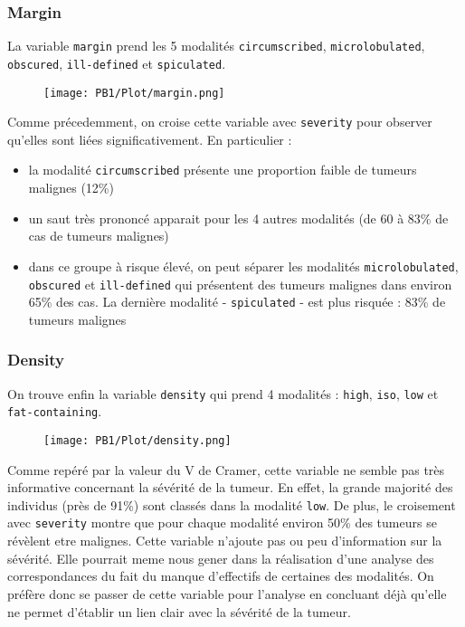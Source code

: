 \documentclass[a4paper]{report}
\begin{document}
\subsubsection{Margin}
La variable \verb|margin| prend les 5 modalités \verb|circumscribed|, \verb|microlobulated|, \verb|obscured|, \verb|ill-defined| et \verb|spiculated|. 

\begin{figure}[!ht]
	\centering
     	\texttt{[image: PB1/Plot/margin.png]} 
\end{figure}

Comme précedemment, on croise cette variable avec \verb|severity| pour observer qu'elles sont liées significativement. En particulier : 
\begin{itemize}
\item la modalité \verb|circumscribed| présente une proportion faible de tumeurs malignes (12\%)
\item un saut très prononcé apparait pour les 4 autres modalités (de 60 à 83\% de cas de tumeurs malignes)
\item dans ce groupe à risque élevé, on peut séparer les modalités  \verb|microlobulated|, \verb|obscured| et \verb|ill-defined| qui présentent des tumeurs malignes dans environ 65\% des cas. La dernière modalité - \verb|spiculated| - est plus risquée : 83\% de tumeurs malignes
\end{itemize}
 

\subsubsection{Density}
On trouve enfin la variable \verb|density| qui prend 4 modalités : \verb|high|, \verb|iso|, \verb|low| et \verb|fat-containing|. 

\begin{figure}[!ht]
	\centering
     	\texttt{[image: PB1/Plot/density.png]} 
\end{figure}

Comme repéré par la valeur du V de Cramer, cette variable ne semble pas très informative concernant la sévérité de la tumeur. En effet, la grande majorité des individus (près de 91\%) sont classés dans la modalité \verb|low|. De plus, le croisement avec \verb|severity| montre que pour chaque modalité environ 50\% des tumeurs se révèlent etre malignes. Cette variable n'ajoute pas ou peu d'information sur la sévérité. Elle pourrait meme nous gener dans la réalisation d'une analyse des correspondances du fait du manque d'effectifs de certaines des modalités. On préfère donc se passer de cette variable pour l'analyse en concluant déjà qu'elle ne permet d'établir un lien clair avec la sévérité de la tumeur.
\end{document}
